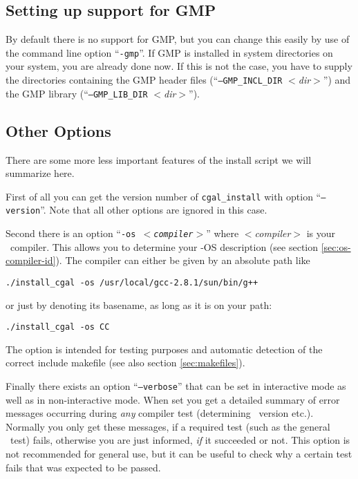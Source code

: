 \subsection{Setting up support for GMP}\label{sec:gmp-setup}

By default there is no support for GMP, but you can change this easily
by use of the command line option ``\texttt{-gmp}''. If GMP is installed
in system directories on your system, you are already done now. If
this is not the case, you have to supply the directories containing
the GMP header files (``\texttt{--GMP\_INCL\_DIR} \textit{$<$dir$>$}'') and
the GMP library (``\texttt{--GMP\_LIB\_DIR} \textit{$<$dir$>$}'').

\subsection{Other Options}\label{sec:other-options}

There are some more less important features of the install script
we will summarize here. 

First of all you can get the version number of \texttt{cgal\_install}
with option ``\texttt{--version}''. Note that all other options are
ignored in this case.

Second there is an option ``\texttt{-os \textit{$<$compiler$>$}}''
where \textit{$<$compiler$>$} is your \CC\ compiler. This allows you
to determine your \cgal-OS description (see section
\ref{sec:os-compiler-id}). The compiler can either be given by an
absolute path like
\begin{verbatim}
./install_cgal -os /usr/local/gcc-2.8.1/sun/bin/g++
\end{verbatim}
or just by denoting its basename, as long as it is on your path:
\begin{verbatim}
./install_cgal -os CC
\end{verbatim}
The option is intended for testing purposes and automatic detection of
the correct include makefile (see also section \ref{sec:makefiles}).

Finally there exists an option ``\texttt{--verbose}'' that can be set
in interactive mode as well as in non-interactive mode. When set you
get a detailed summary of error messages occurring during \textit{any}
compiler test (determining \stl\ version etc.). Normally you only get
these messages, if a required test (such as the general \stl\ test)
fails, otherwise you are just informed, \textit{if} it succeeded or
not.  This option is not recommended for general use, but it can be
useful to check why a certain test fails that was expected to be
passed.

